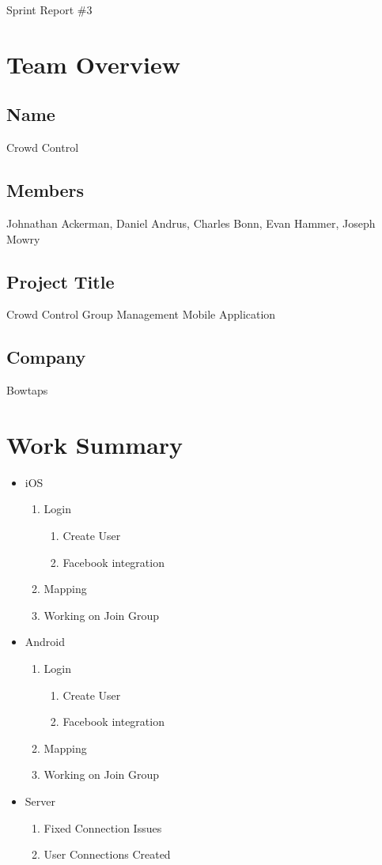 \documentclass[11pt]{article}
\begin{document}
{\fontsize{16}{16}\selectfont Sprint  Report \#3}

\section*{Team Overview}

\subsection*{Name}
Crowd Control
\subsection*{Members}
Johnathan Ackerman, Daniel Andrus, Charles Bonn, Evan Hammer, Joseph Mowry
\subsection*{Project Title}
Crowd Control Group Management Mobile Application
\subsection*{Company}
Bowtaps

\section*{Work Summary}
	\begin{itemize}
	\item iOS
		\begin{enumerate}
		\item Login
			\begin{enumerate}
			\item Create User
			\item Facebook integration
			\end{enumerate}
		\item Mapping
		\item Working on Join Group
		\end{enumerate}
	\item Android
		\begin{enumerate}
		\item Login
			\begin{enumerate}
			\item Create User
			\item Facebook integration
			\end{enumerate}
		\item Mapping
		\item Working on Join Group
		\end{enumerate}
	\item Server
		\begin{enumerate}
		\item Fixed Connection Issues
		\item User Connections Created
		\end{enumerate}

	\end{itemize}
\end{document}
